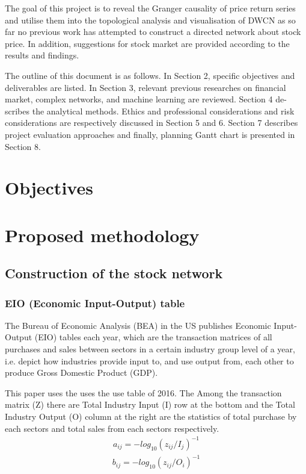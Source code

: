 The goal of this project is to reveal the Granger causality of price return series and utilise them into the topological analysis and visualisation of DWCN as so far no previous work has attempted to construct a directed network about stock price. In addition, suggestions for stock market are provided according to the results and findings.

The outline of this document is as follows. In Section 2, specific objectives and deliverables are listed. In Section 3, relevant previous researches on financial market, complex networks, and machine learning are reviewed. Section 4 de- scribes the analytical methods. Ethics and professional considerations and risk considerations are respectively discussed in Section 5 and 6. Section 7 describes project evaluation approaches and finally, planning Gantt chart is presented in Section 8.

\section{Objectives}

\section{Proposed methodology}
\subsection{Construction of the stock network}
\subsubsection{EIO (Economic Input-Output) table}

The Bureau of Economic Analysis (BEA) in the US publishes Economic Input-Output (EIO) tables each year, which are the transaction matrices of all purchases and sales between sectors in a certain industry group level of a year, i.e. depict how industries provide input to, and use output from, each other to produce Gross Domestic Product (GDP).

This paper uses the uses the use table of 2016. The Among the transaction matrix (Z) there are Total Industry Input (I) row at the bottom and the Total Industry Output (O) column at the right are the statistics of total purchase by each sectors and total sales from each sectors respectively.
\begin{eqnarray}\label{equ:eio_i}
a_{ij} = -log_{10}(z_{ij} / I_j)^{-1}
\end{eqnarray}
\begin{eqnarray}\label{equ:eio_o}
b_{ij} = -log_{10}(z_{ij} / O_i)^{-1}
\end{eqnarray}
